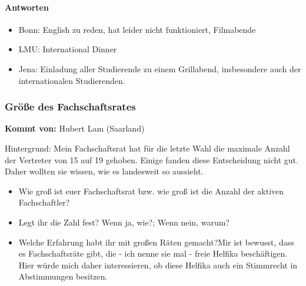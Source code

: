       \paragraph{Antworten}
        \begin{itemize}
          \item Bonn: English zu reden, hat leider nicht funktioniert, Filmabende
          \item LMU: International Dinner
          \item Jena: Einladung aller Studierende zu einem Grillabend, insbesondere auch der internationalen Studierenden.
        \end{itemize}

    \subsubsection*{Größe des Fachschaftsrates}
      \textbf{Kommt von:} Hubert Lam (Saarland)

      Hintergrund: Mein Fachschaftsrat hat für die letzte Wahl die maximale Anzahl der Vertreter von 15 auf 19 gehoben. Einige fanden diese Entscheidung nicht gut. Daher wollten sie wissen, wie es landesweit so aussieht. \\

      \begin{itemize}
        \item Wie groß ist euer Fachschaftsrat bzw. wie groß ist die Anzahl der aktiven Fachschaftler?
        \item Legt ihr die Zahl fest? Wenn ja, wie?; Wenn nein, warum?
        \item Welche Erfahrung habt ihr mit großen Räten gemacht?Mir ist bewusst, dass es Fachschaftsräte gibt, die - ich nenne sie mal - freie Helfika beschäftigen. Hier würde mich daher interessieren, ob diese Helfika auch ein Stimmrecht in Abstimmungen besitzen.
      \end{itemize}

